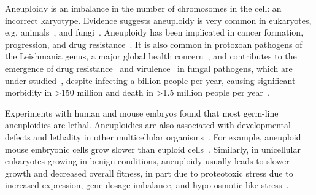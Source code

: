 \documentclass[12pt]{extarticle}
\begin{document}
Aneuploidy is an imbalance in the number of chromosomes in the cell: an incorrect karyotype.
Evidence suggests aneuploidy is very common in eukaryotes, e.g. animals~\citep{Santaguida2015review, Naylor2016, Bakhoum2017}, and fungi~\citep{Pavelka2010, Zhu2016, Robbins2017, Todd2017}.
Aneuploidy has been implicated in cancer formation, progression, and drug resistance~\citep{Boveri2008, Schvartzman2010, Santaguida2015review, Rutledge2016, Ippolito2021b, Lukow2021}.
It is also common in protozoan pathogens of the Leishmania genus, a major global health concern~\citep{Mannaert2012}, and contributes to the emergence of drug resistance~\citep{Selmecki2009} and virulence~\citep{Moller2018} in fungal pathogens, which are under-studied~\citep{Rodrigues2018}, despite infecting a billion people per year, causing significant morbidity in >150 million and death in >1.5 million people per year~\citep{Selmecki2009, Rodrigues2018}.

Experiments with human and mouse embryos found that most germ-line aneuploidies are lethal.
Aneuploidies are also associated with developmental defects and lethality in other multicellular organisms~\citep{Sheltzer2011}. %
For example, aneuploid mouse embryonic cells grow slower than euploid cells~\citep{Williams2008}.
Similarly, in unicellular eukaryotes growing in benign conditions, aneuploidy usually leads to slower growth and decreased overall fitness, in part due to proteotoxic stress due to increased expression, gene dosage imbalance, and hypo-osmotic-like stress~\citep{Niwa2006, Torres2007, Pavelka2010, Sheltzer2011, Santaguida2015, Kasuga2016, Zhu2018, Tsai2019, Yang2021, Robinson2023}.
\end{document}
